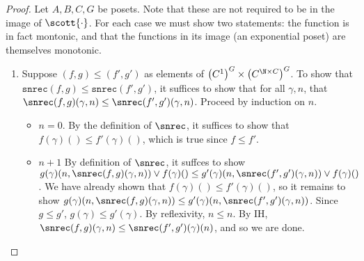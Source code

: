 \auxsemlemma*
\begin{proof}
Let $A,B,C,G$ be posets. Note that these are not required to be in the image of $\scott{\cdot}$. For each case we must show two statements: the function is in fact montonic, and that the functions in its image (an exponential poset) are themselves monotonic.
\begin{enumerate}
  \item Suppose $(f,g) \leq (f',g')$ as elements of ${\left(C^1\right)}^G\times {\left(C^{\N\times C}\right)}^G$. To show that $\texttt{snrec}(f,g) \leq \texttt{snrec}(f',g')$, it suffices to show that for all $\gamma,n$, that $\snrec(f,g)(\gamma,n) \leq \snrec(f',g')(\gamma,n)$. Proceed by induction on $n$.
  \begin{itemize}
    \item $n = 0$. By the definition of $\snrec$, it suffices to show that $f(\gamma)() \leq f'(\gamma)()$, which is true since $f \leq f'$.
    \item $n+1$ By definition of $\snrec$, it suffces to show $g(\gamma)(n,\snrec(f,g)(\gamma,n)) \vee f(\gamma)() \leq g'(\gamma)(n,\snrec(f',g')(\gamma,n)) \vee f(\gamma)()$. We have already shown that $f(\gamma)() \leq f'(\gamma)()$, so it remains to show $g(\gamma)(n,\snrec(f,g)(\gamma,n)) \leq g'(\gamma)(n,\snrec(f',g')(\gamma,n))$. Since $g \leq g'$, $g(\gamma) \leq g'(\gamma)$. By reflexivity, $n \leq n$. By IH, $\snrec(f,g)(\gamma,n) \leq \snrec(f',g')(\gamma)(n)$, and so we are done.
    

\end{itemize}
\end{enumerate}
\end{proof}
